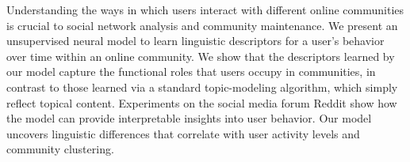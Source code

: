 Understanding the ways in which users interact with different online communities is crucial to social network analysis and community maintenance. We present an unsupervised neural model to learn linguistic descriptors for a user's behavior over time within an online community. We show that the descriptors learned by our model capture the functional roles that users occupy in communities, in contrast to those learned via a standard topic-modeling algorithm, which simply reflect topical content. Experiments on the social media forum Reddit show how the model can provide interpretable insights into user behavior. Our model uncovers linguistic differences that correlate with user activity levels and community clustering.
